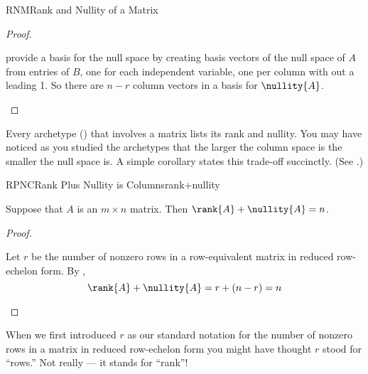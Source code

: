 \begin{subsect}{RNM}{Rank and Nullity of a Matrix}
\begin{proof}
%
\begin{para} provide a basis for the null space by creating basis vectors of the null space of $A$ from entries of $B$, one for each independent variable, one per column with out a leading 1.  So there are $n-r$ column vectors in a basis for $\nullity{A}$.\end{para}
%
\end{proof}
%
\begin{para}Every archetype () that involves a matrix lists its rank and nullity.  You may have noticed as you studied the archetypes that the larger the column space is the smaller the null space is.  A simple corollary states this trade-off succinctly.    (See .)\end{para}
%
\begin{theorem}{RPNC}{Rank Plus Nullity is Columns}{rank+nullity}
\begin{para}Suppose that $A$ is an $m\times n$ matrix.  Then $\rank{A}+\nullity{A}=n$.\end{para}
\end{theorem}
%
\begin{proof}
\begin{para}Let $r$ be the number of nonzero rows in a row-equivalent matrix in reduced row-echelon form.
By ,
%
\begin{equation*}
\rank{A}+\nullity{A}= r+(n-r)=n
\end{equation*}\end{para}
%
\end{proof}
%
\begin{para}When we first introduced $r$ as our standard notation for the number of nonzero rows in a matrix in reduced row-echelon form you might have thought $r$ stood for ``rows.''  Not really --- it stands for ``rank''!\end{para}
%
%
\end{subsect}
%
